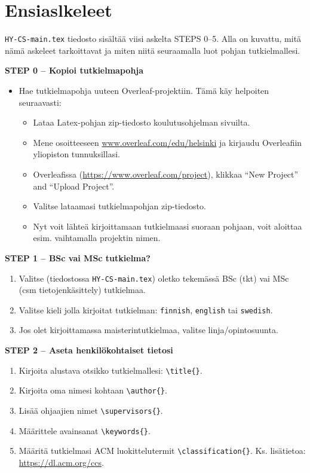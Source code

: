 
\label{appendix:instructions_finnish}

\section{Ensiaslkeleet}

\texttt{HY-CS-main.tex} tiedosto sisältää viisi askelta STEPS 0--5. Alla on kuvattu, mitä nämä askeleet tarkoittavat ja miten niitä seuraamalla luot pohjan tutkielmallesi.
\vspace{0.5cm}

\textbf{STEP 0 -- Kopioi tutkielmapohja}

\begin{itemize}
\item Hae tutkielmapohja uuteen Overleaf-projektiin. Tämä käy helpoiten seuraavasti:
\begin{itemize}
    \item Lataa Latex-pohjan zip-tiedosto koulutusohjelman sivuilta.
    \item Mene osoitteeseen \url{www.overleaf.com/edu/helsinki} ja kirjaudu Overleafiin yli\-opiston tunnuksillasi.
    \item Overleafissa (\url{https://www.overleaf.com/project}), klikkaa ``New Project'' and ``Upload Project''.
    \item Valitse lataamasi tutkielmapohjan zip-tiedosto.
    \item Nyt voit lähteä kirjoittamaan tutkielmaasi suoraan pohjaan, voit aloittaa esim. vaihtamalla projektin nimen.
\end{itemize}
\end{itemize}


{\textbf{STEP 1 -- BSc vai MSc tutkielma?}}
\begin{enumerate}
\item Valitse (tiedostossa \texttt{HY-CS-main.tex}) oletko tekemässä BSc (tkt) vai MSc (csm tietojenkäsittely) tutkielmaa.
\item Valitse kieli jolla kirjoitat tutkielman: \texttt{finnish}, \texttt{english} tai \texttt{swedish}.
\item Jos olet kirjoittamassa maisterintutkielmaa, valitse linja/opintosuunta.
\end{enumerate}


{\textbf{STEP 2 -- Aseta henkilökohtaiset tietosi}}

\begin{enumerate}
\item Kirjoita alustava otsikko tutkielmallesi: \texttt{\textbackslash title\{\}}.
\item Kirjoita oma nimesi kohtaan \texttt{\textbackslash author\{\}}.
\item Lisää ohjaajien nimet \texttt{\textbackslash supervisors\{\}}.
\item Määrittele avainsanat \texttt{\textbackslash keywords\{\}}.
\item Määritä tutkielmasi ACM luokittelutermit \texttt{\textbackslash classification\{\}}. Ks. lisätietoa: \url{https://dl.acm.org/ccs}.
\end{enumerate}

